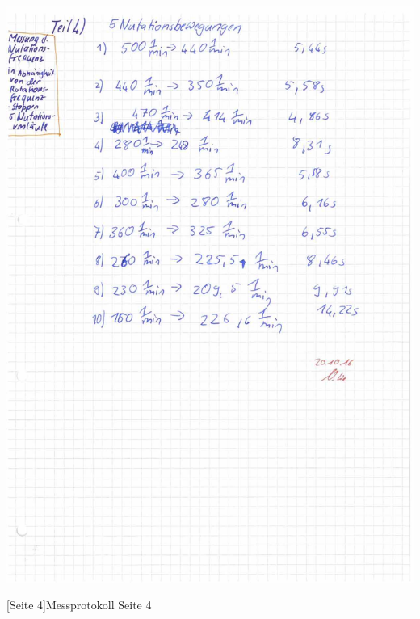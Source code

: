 \documentclass[12pt,a4paper,]{scrreprt}
\begin{document}
        \begin{center}
    		\includegraphics[scale=0.32]{4.jpg}
    	\end{center}
    	[Seite 4]{Messprotokoll Seite 4}
    	\pagebreak
    	
\end{document}
